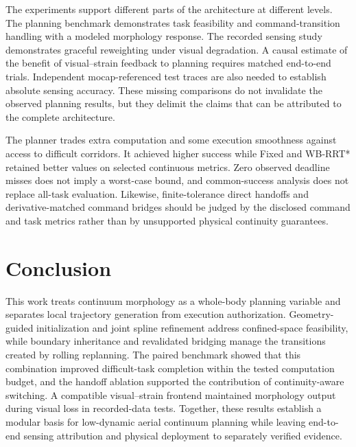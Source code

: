 \documentclass[journal,twoside]{IEEEtran}
\begin{document}
The experiments support different parts of the architecture at different levels. The planning benchmark demonstrates task feasibility and command-transition handling with a modeled morphology response. The recorded sensing study demonstrates graceful reweighting under visual degradation. A causal estimate of the benefit of visual--strain feedback to planning requires matched end-to-end trials. Independent mocap-referenced test traces are also needed to establish absolute sensing accuracy. These missing comparisons do not invalidate the observed planning results, but they delimit the claims that can be attributed to the complete architecture.

The planner trades extra computation and some execution smoothness against access to difficult corridors. It achieved higher success while Fixed and WB-RRT* retained better values on selected continuous metrics. Zero observed deadline misses does not imply a worst-case bound, and common-success analysis does not replace all-task evaluation. Likewise, finite-tolerance direct handoffs and derivative-matched command bridges should be judged by the disclosed command and task metrics rather than by unsupported physical continuity guarantees.

\section{Conclusion}\label{sec:conclusion}
This work treats continuum morphology as a whole-body planning variable and separates local trajectory generation from execution authorization. Geometry-guided initialization and joint spline refinement address confined-space feasibility, while boundary inheritance and revalidated bridging manage the transitions created by rolling replanning. The paired benchmark showed that this combination improved difficult-task completion within the tested computation budget, and the handoff ablation supported the contribution of continuity-aware switching. A compatible visual--strain frontend maintained morphology output during visual loss in recorded-data tests. Together, these results establish a modular basis for low-dynamic aerial continuum planning while leaving end-to-end sensing attribution and physical deployment to separately verified evidence.



\end{document}
